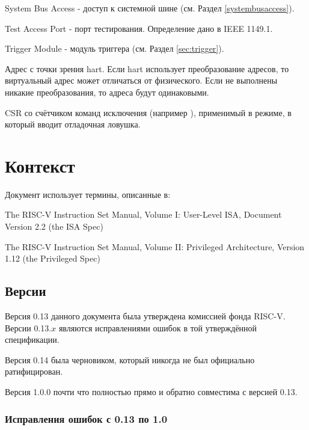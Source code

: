 \begin{description}[style=nextline]
    \item[SBA]
        System Bus Access - доступ к системной шине (см. Раздел \ref{systembusaccess}).
    \item[TAP]
        Test Access Port - порт тестирования. Определение дано в IEEE 1149.1.
    \item[TM]
        Trigger Module - модуль триггера (см. Раздел \ref{sec:trigger}).
    \item[виртуальный адрес]
        Адрес с точки зрения hart. Если hart использует преобразование адресов, то
        виртуальный адрес может отличаться от физического. Если не выполнены никакие преобразования,
        то адреса будут одинаковыми.
    \item[\Rxepc]
        CSR со счётчиком команд исключения (например \Rmepc), применимый в
        режиме, в который вводит отладочная ловушка.
\end{description}

\section{Контекст}

\begin{steps}{Документ использует термины, описанные в:}
\item The RISC-V Instruction Set Manual, Volume I: User-Level ISA, Document
    Version 2.2 (the ISA Spec)
\item The RISC-V Instruction Set Manual, Volume II: Privileged Architecture,
    Version 1.12 (the Privileged Spec)
\end{steps}

\subsection{Версии}

Версия 0.13 данного документа была утверждена комиссией фонда RISC-V.
Версии 0.13.$x$ являются исправлениями ошибок в той утверждённой спецификации.

Версия 0.14 была черновиком, который никогда не был официально ратифицирован.

Версия 1.0.0 почти что полностью прямо и обратно совместима с версией 0.13.

\newcommand{\PR}[1]{\href{https://github.com/riscv/riscv-debug-spec/pull/#1}{\##1}}

\subsubsection{Исправления ошибок с 0.13 по 1.0}

